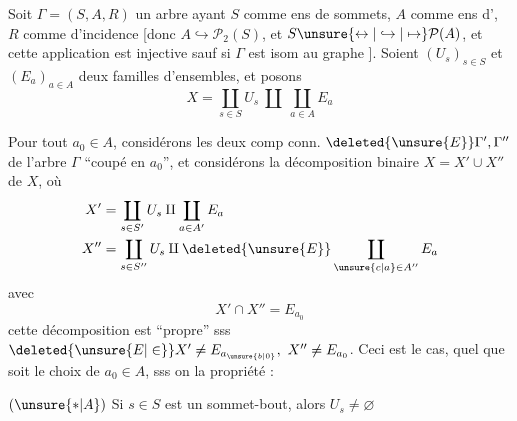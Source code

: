 Soit  $\Gamma=(S,A,R)$ un arbre ayant $S$ comme ens de sommets, $A$ \unsure{-} comme ens d', $R$ comme  d'incidence [donc
$A\hookrightarrow\mathcal{P}_2(S)$, et $S\unsure{\leftrightarrow|\hookrightarrow|\mapsto}\mathcal{P}(A)$, et cette application est injective sauf si $\Gamma$ est isom au graphe
\diagram{\begin{tikzcd}[ampersand replacement=\&,column sep=1.4em]
\bullet \arrow[r,dash] \& \bullet
\end{tikzcd}}
]. Soient $(U_s)_{s\in S}$ et $(E_a)_{a\in A}$ deux familles d'ensembles, et posons
\[
X=\coprod_{s\in S}U_s\ \amalg\ \coprod_{a\in A}E_a
\]

Pour tout $a_0\in A$, considérons les deux comp conn. $\deleted{\unsure{E}}\Gamma',\Gamma''$ de l'arbre $\Gamma$ ``coupé en $a_0$'', et considérons la décomposition binaire  $X=X'\cup X''$ de $X$,
où
\[
\begin{aligned}
X'&=\coprod_{s\in S'}U_s\amalg\coprod_{a\in A'}E_a\\
X''&=\coprod_{s\in S''}U_s\amalg\deleted{\unsure{E}}\coprod_{\unsure{c|a}\in A''}E_a
\end{aligned}
\]
avec
\[
X'\cap X''=E_{a_0}
\]
cette décomposition est ``propre'' sss $\deleted{\unsure{E|\in}}X'\ne E_{a_{\unsure{b|0}}},\ X''\ne E_{a_0}$. Ceci est le cas, quel que soit le choix de $a_0\in A$, sss on  la propriété  :

$(\unsure{\ast|A})$ Si $s\in S$ est un sommet-bout, alors $U_s\ne\varnothing$
